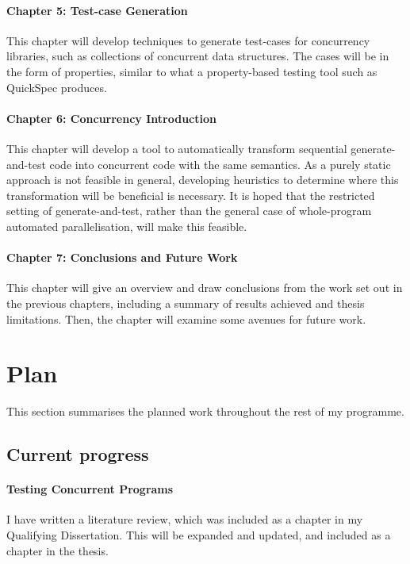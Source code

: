 \documentclass{article}
\begin{document}
\paragraph{Chapter 5: Test-case Generation} This chapter will develop
techniques to generate test-cases for concurrency libraries, such as
collections of concurrent data structures. The cases will be in the
form of properties, similar to what a property-based testing tool such
as QuickSpec\cite{claessen2010} produces.

\paragraph{Chapter 6: Concurrency Introduction} This chapter will
develop a tool to automatically transform sequential generate-and-test
code into concurrent code with the same semantics. As a purely static
approach is not feasible in general\cite{calderon2015}, developing
heuristics to determine where this transformation will be beneficial
is necessary. It is hoped that the restricted setting of
generate-and-test, rather than the general case of whole-program
automated parallelisation, will make this feasible.

\paragraph{Chapter 7: Conclusions and Future Work} This chapter will
give an overview and draw conclusions from the work set out in the
previous chapters, including a summary of results achieved and thesis
limitations. Then, the chapter will examine some avenues for future
work.

\section{Plan}

This section summarises the planned work throughout the rest of my
programme.

\subsection{Current progress}

\paragraph{Testing Concurrent Programs} I have written a literature
review, which was included as a chapter in my Qualifying Dissertation.
This will be expanded and updated, and included as a chapter in the
thesis.
\end{document}
